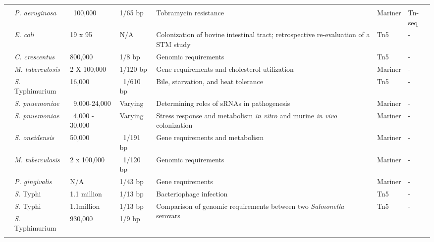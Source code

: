 \begin{landscape}
\begin{longtable}{ l
    				l
				l
				l
				p{2in}
				l
				l}
          &       &       &  &       &       &  \\
    \multirow{2}[0]{*}{\textcite{Gallagher2011}}  & \multirow{2}[0]{*}{\textit{P. aeruginosa}} & \multirow{2}[0]{*}{~100,000} & \multirow{2}[0]{*}{1/65 bp} & \multirow{2}[0]{2in}{Tobramycin resistance} & \multirow{2}[0]{*}{Mariner} & \multirow{2}[0]{*}{Tn-seq} \\
          &       &       &       &       &       & (circle method)  \\
    \textcite{Eckert2011}  & \textit{E. coli} & 19 x 95 & N/A & Colonization of bovine intestinal tract; retrospective re-evaluation of a STM study & Tn5   & - \\
    \textcite{Christen2011}  & \textit{C. crescentus} & 800,000 & 1/8 bp & Genomic requirements & Tn5   & - \\
    \textcite{Griffin2011}  & \textit{M. tuberculosis} & 2 X 100,000 & 1/120 bp & Gene requirements and cholesterol utilization & Mariner & - \\
    \textcite{Khatiwara2012}  & {\it S.} Typhimurium & 16,000 & ~1/610 bp & Bile, starvation, and heat tolerance & Tn5   & - \\
    \textcite{Mann2012}  & \textit{S. pnuemoniae} & ~9,000-24,000 & Varying & Determining roles of sRNAs in pathogenesis & Mariner & - \\
    \textcite{Opijnen2012}  & \textit{S. pnuemoniae} & ~4,000 - 30,000 & Varying & Stress response and metabolism {\it in vitro} and murine {\it in vivo} colonization & Mariner & - \\
    \textcite{Brutinel2012} & \textit{S. oneidensis} & 50,000 &  ~1/191 bp & Gene requirements and metabolism & Mariner & - \\
    \textcite{Zhang2012} & \textit{M. tuberculosis} & 2 x 100,000 &  ~1/120 bp & Genomic requirements & Mariner & - \\
    \textcite{Klein2012}  & \textit{P. gingivalis} & N/A   & 1/43 bp & Gene requirements & Mariner & - \\
    \textcite{Pickard2013}  & {\it S.} Typhi & 1.1 million & 1/13 bp & Bacteriophage infection & Tn5   & - \\
    \multirow{2}[1]{*}{\textcite{Barquist2013a}}  & {\it S.} Typhi & 1.1million & 1/13 bp & \multirow{2}[1]{2in}{Comparison of genomic requirements between two {\it Salmonella} serovars} & \multirow{2}[1]{*}{Tn5} & \multirow{2}[1]{*}{-} \\
          & {\it S.} Typhimurium & 930,000 & 1/9 bp &       &       &  \\
    \bottomrule
    \label{tab:studies}%
    \end{longtable}%
\end{landscape}%
\endgroup

